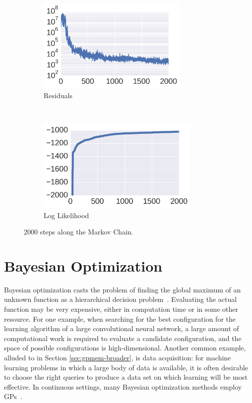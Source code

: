 \documentclass{article} %
\begin{document}
\begin{figure}
        \centering
        \begin{subfigure}[b]{0.5\textwidth} \centering
                \includegraphics[height=4.5cm]{figs/structureAirline_res_c.png}
                \caption{Residuals}
                \label{fig:res}
        \end{subfigure}%
        ~ %
        \begin{subfigure}[b]{0.5\textwidth} \centering
                \includegraphics[height=4.5cm]{figs/structureAirline_log_c.png}
                \caption{Log Likelihood}
                \label{fig:log))}
        \end{subfigure}
        \caption{2000 steps along the Markov Chain.}\label{fig:reslog}
\end{figure}


\FloatBarrier
\section{Bayesian Optimization}\label{sec:bayesopt}
Bayesian optimization casts the problem of finding the global maximum of an unknown function as a hierarchical decision problem~\citep{ghahramani2015probabilistic}.
Evaluating the actual function may be very expensive, either in computation time or in some other resource.
For one example, when searching for the best configuration for the learning algorithm of a large convolutional neural network, a large amount of computational work is required to evaluate a candidate configuration, and the space of possible configurations is high-dimensional.
Another common example, alluded to in Section \ref{sec:gpmem-broader}, is data acquisition: for machine learning problems in which a large body of data is available, it is often desirable to choose the right queries to produce a data set on which learning will be most effective.
In continuous settings, many Bayesian optimization methods employ GPs~\citep[e.g.][]{snoek2012practical}.
\end{document}
